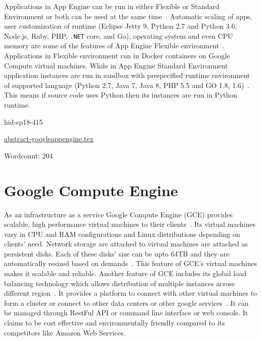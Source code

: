Applications in App Engine can be run in either Flexible or Standard Environment or 
both can be used at the same time~\cite{hid-sp18-415-www-cloud-goggle}. 
Automatic scaling of apps, user customization of runtime (Eclipse Jetty 9, 
Python 2.7 and Python 3.6, Node.js, Ruby, PHP, \verb|.NET| core, and Go), operating 
system and even CPU memory  are some of the features of App Engine Flexible 
environment~\cite{hid-sp18-415-www-cloud-goggle}. Applications in Flexible 
environment run in Docker containers on Google Compute virtual machines. While 
in App Engine Standard Environment application instances are run in sandbox with 
prespecified runtime environment of supported language (Python 2.7, Java 7, 
Java 8, PHP 5.5 and GO 1.8,  1.6)~\cite{hid-sp18-415-app-engine}. 
This means if source code uses Python then its instances are run in Python runtime. 


\begin{IU}

hid-sp18-415

\href{https://github.com/cloudmesh-community/hid-sp18-415/blob/master//technology/abstract-googleappengine.tex}{abstract-googleappengine.tex}

 

Wordcount: 204

\end{IU}

\section{Google Compute Engine}

As an infrastructure as a service Google Compute Engine (GCE) provides scalable, 
high performance  virtual machines to their clients~\cite{hid-sp18-415-cloud-google}. 
Its virtual machines vary in CPU and RAM configurations  and Linux distributions 
depending on clients’ need. Network storage are attached to virtual machines are 
attached as persistent disks. Each of these disks’ size can be upto 64TB and 
they are automatically resized based on demands~\cite{hid-sp18-415-cloud-google}. 
This feature of GCE’s virtual machines makes it scalable and reliable. Another 
feature of GCE includes its global load balancing technology which allows 
distribution of multiple instances across different region~\cite{hid-sp18-415-cloud-google}. 
It provides a platform to connect with other virtual machines to form a cluster or 
connect to other data centers or other google services~\cite{hid-sp18-415-cloud-google}. 
It can be managed through RestFul API or command line interface or web console. 
It claims to be cost effective and environmentally friendly compared to its 
competitors like Amazon Web Services.


